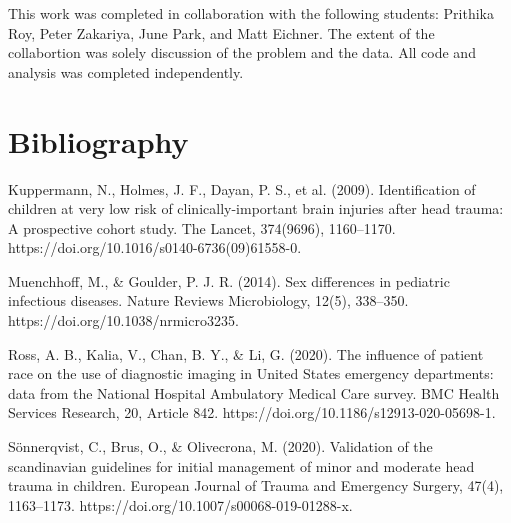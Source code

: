 \documentclass[10pt,letterpaper]{article}
\begin{document}
This work was completed in collaboration with the following students: Prithika Roy, Peter Zakariya, June Park, and Matt Eichner. The extent of the collabortion was solely discussion of the problem and the data. All code and analysis was completed independently.

\section{Bibliography}\label{bibliography}

 \begin{enumerate}[label={[\arabic*]}]
    \item Kuppermann, N., Holmes, J. F., Dayan, P. S., et al. (2009). Identification of children at very low risk of clinically-important brain injuries after head trauma: A prospective cohort study. The Lancet, 374(9696), 1160–1170. https://doi.org/10.1016/s0140-6736(09)61558-0.
    \item Muenchhoff, M., \& Goulder, P. J. R. (2014). Sex differences in pediatric infectious diseases. Nature Reviews Microbiology, 12(5), 338–350. https://doi.org/10.1038/nrmicro3235.
    \item Ross, A. B., Kalia, V., Chan, B. Y., \& Li, G. (2020). The influence of patient race on the use of diagnostic imaging in United States emergency departments: data from the National Hospital Ambulatory Medical Care survey. BMC Health Services Research, 20, Article 842. https://doi.org/10.1186/s12913-020-05698-1.
    \item Sönnerqvist, C., Brus, O., \& Olivecrona, M. (2020). Validation of the scandinavian guidelines for initial management of minor and moderate head trauma in children. European Journal of Trauma and Emergency Surgery, 47(4), 1163–1173. https://doi.org/10.1007/s00068-019-01288-x.
 \end{enumerate}
\end{document}
